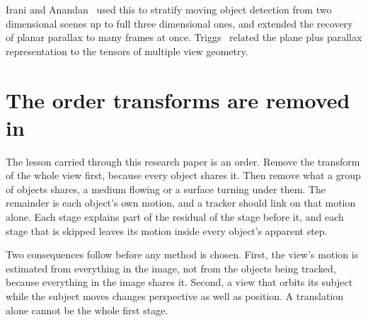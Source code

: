 Irani and Anandan~\cite{src:Irani-and-Anandan} used this to stratify moving object detection from two dimensional scenes up to
full three dimensional ones, and extended the recovery of planar parallax to many frames at once.
Triggs~\cite{src:Triggs-2000} related the plane plus parallax representation to the tensors of multiple view geometry.

\section{The order transforms are removed in}

The lesson carried through this research paper is an order. Remove the transform of the whole view first,
because every object shares it. Then remove what a group of objects shares, a medium flowing or a
surface turning under them. The remainder is each object's own motion, and a tracker should link on
that motion alone. Each stage explains part of the residual of the stage before it, and each
stage that is skipped leaves its motion inside every object's apparent step.

Two consequences follow before any method is chosen. First, the view's motion is estimated from
everything in the image, not from the objects being tracked, because everything in the image shares
it. Second, a view that orbits its subject while the subject moves changes perspective as well as
position. A translation alone cannot be the whole first stage.
